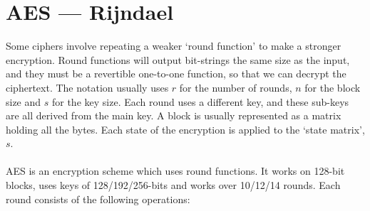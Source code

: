 \section{AES --- Rijndael}
    Some ciphers involve repeating a weaker `round function' to make a stronger encryption. Round functions will output bit-strings the same size as the input, and they must be a revertible one-to-one function, so that we can decrypt the ciphertext. The notation usually uses $r$ for the number of rounds, $n$ for the block size and $s$ for the key size. Each round uses a different key, and these sub-keys are all derived from the main key. A block is usually represented as a matrix holding all the bytes. Each state of the encryption is applied to the `state matrix', $s$.\\
    \\
    AES is an encryption scheme which uses round functions. It works on 128-bit blocks, uses keys of 128/192/256-bits and works over 10/12/14 rounds. Each round consists of the following operations:\\
    \newcommand{\leftminipagewidth}{0.3\textwidth}
    \newcommand{\rightminipagewidth}{0.7\textwidth}
